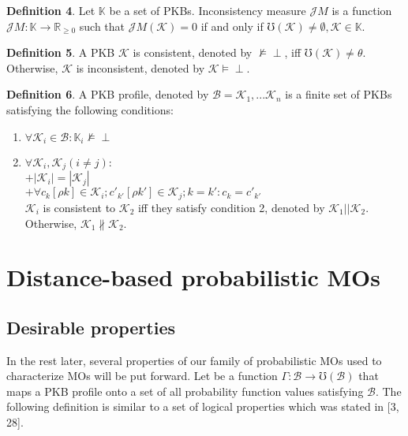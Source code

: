\documentclass[]{iosart2c}
\begin{document}
    \textbf{Definition 4}. Let $\mathbb{K}$ be a set of PKBs. Inconsistency measure $\mathcal{J}M$ is a function $\mathcal{J}M: \mathbb{K} \to \mathbb {R}_{\geq 0}$ such that $\mathcal{J}M(\mathcal{K}) = 0$ if and only if $\mho (\mathcal{K}) \neq \emptyset, \mathcal{K} \in \mathbb{K}$.

    \textbf{Definition 5}. A PKB $\mathcal{K}$ is consistent, denoted by $\nvDash \perp$, iff $\mho (\mathcal{K}) \neq \theta$. Otherwise, $\mathcal{K}$ is inconsistent, denoted by $\mathcal{K} \models \perp$.

    \textbf{Definition 6}. A PKB profile, denoted by $\mathcal{B} = {\mathcal{K}_1, ...\mathcal{K}_n}$ is a finite set of PKBs satisfying the following conditions:

    \begin{enumerate}

        \item $\forall \mathcal{K}_i \in \mathcal{B} : \mathbb{K}_i \nvDash \perp$
        \item $\forall \mathcal{K}_i,\mathcal{K}_j (i \neq j) :$\\
        $+|\mathcal{K}_i| = |\mathcal{K}_j|$ \\
        $+\forall c_k[\rho k] \in \mathcal{K}_i; c'_{k'} [\rho k'] \in \mathcal{K}_j; k = k' : c_k = c'_{k'}$\\
        $\mathcal{K}_i$ is consistent to $\mathcal{K}_2$ iff they satisfy condition 2, denoted by $\mathcal{K}_1||\mathcal{K}_2$. Otherwise, $\mathcal{K}_1 \nparallel \mathcal{K}_2$.

    \end{enumerate}


    \section{Distance-based probabilistic MOs}

    \subsection{Desirable properties}

    In the rest later, several properties of our family of probabilistic MOs used to characterize MOs will be put forward. Let be a function $\Gamma: \mathcal{B} \to \mho(\mathcal{B})$ that maps a PKB profile onto a set of all probability function values satisfying $\mathcal{B}$. The following definition is similar to a set of logical properties which was stated in [3, 28].
\end{document}
